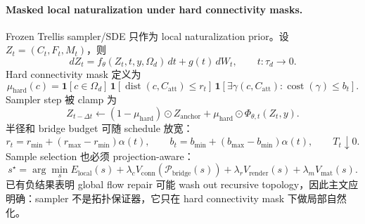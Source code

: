\paragraph{Masked local naturalization under hard connectivity masks.}
Frozen Trellis sampler/SDE 只作为 local naturalization prior。设 \(Z_t=(C_t,F_t,M_t)\)，则
\begin{equation}
dZ_t=f_\theta(Z_t,t,y,\Omega_d)\,dt+g(t)\,dW_t,\qquad t:\tau_d\rightarrow0 .
\end{equation}
Hard connectivity mask 定义为
\begin{equation}
\mu_{\mathrm{hard}}(c)=
\mathbf 1[c\in\Omega_d]\,
\mathbf 1[\operatorname{dist}(c,C_{\mathrm{att}})\le r_t]\,
\mathbf 1[\exists\gamma(c,C_{\mathrm{att}}):\operatorname{cost}(\gamma)\le b_t].
\end{equation}
Sampler step 被 clamp 为
\begin{equation}
Z_{t-\Delta t}\leftarrow
(1-\mu_{\mathrm{hard}})\odot Z_{\mathrm{anchor}}
+\mu_{\mathrm{hard}}\odot\Phi_{\theta,t}(Z_t,y).
\end{equation}
半径和 bridge budget 可随 schedule 放宽：
\begin{equation}
r_t=r_{\min}+(r_{\max}-r_{\min})\alpha(t),\qquad
b_t=b_{\min}+(b_{\max}-b_{\min})\alpha(t),\qquad
T_t\downarrow0 .
\end{equation}
Sample selection 也必须 projection-aware：
\begin{equation}
s^\star=
\arg\min_s
E_{\mathrm{local}}(s)
+\lambda_c V_{\mathrm{conn}}(\mathcal P_{\mathrm{bridge}}(s))
+\lambda_r V_{\mathrm{render}}(s)
+\lambda_m V_{\mathrm{mat}}(s).
\end{equation}
已有负结果表明 global flow repair 可能 wash out recursive topology，因此主文应明确：sampler 不是拓扑保证器，它只在 hard connectivity mask 下做局部自然化。

